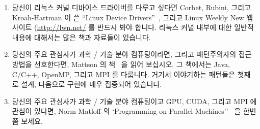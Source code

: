 \begin{enumerate}
\iffalse
\item	If you are interested in an object-oriented patternist
	treatment of parallel programming focussing on C++,
	you might try Volumes~2 and 4 of Schmidt's POSA
	series~\cite{SchmidtStalRohnertBuschmann2000v2Textbook,
	BuschmannHenneySchmidt2007v4Textbook}.
	Volume 4 in particular has some interesting chapters
	applying this work to a warehouse application.
	The realism of this example is attested to by
	the section entitled ``Partitioning the Big Ball of Mud'',
	wherein the problems inherent in parallelism often
	take a back seat to the problems inherent in getting
	one's head around a real-world application.
\fi

\item	당신이 리눅스 커널 디바이스 드라이버를 다루고 싶다면 Corbet, Rubini,
	그리고 Kroah-Hartman 이 쓴 ``Linux Device
	Drivers''~\cite{CorbetRubiniKroahHartman}, 그리고 Linux Weekly New
	웹사이트 (\url{http://lwn.net/} 를 반드시 봐야 합니다.
	리눅스 커널 내부에 대한 일반적 내용에 대해서는 많은 책과 자료들이
	있습니다.

\iffalse
\item	If you want to work with Linux-kernel device drivers,
	then Corbet's, Rubini's, and Kroah-Hartman's
	``Linux Device Drivers''~\cite{CorbetRubiniKroahHartman}
	is indespensible, as is the Linux Weekly News web site
	(\url{http://lwn.net/}.
	There is a large number of books and resources on
	the more general topic of Linux kernel internals.
\fi

\item	당신의 주요 관심사가 과학 / 기술 분야 컴퓨팅이라면, 그리고 패턴주의자의
	접근방법을 선호한다면, Mattson 의 책~\cite{Mattson2005Textbook} 을 읽어
	보십시오.
	그 책에서는 Java, C/C++, OpenMP, 그리고 MPI 를 다룹니다.
	거기서 이야기하는 패턴들은 첫째로 설계, 다음으로 구현에 매우 집중되어
	있습니다.

\iffalse
\item	If your primary focus is scientific and technical computing,
	and you prefer a patternist approach,
	you might try Mattson et al.'s
	textbook~\cite{Mattson2005Textbook}.
	It covers Java, C/C++, OpenMP, and MPI.
	Its patterns are admirably focused first on design,
	then on implementation.
\fi

\item	당신의 주요 관심사가 과학 / 기술 분야 컴퓨팅이고 GPU, CUDA, 그리고 MPI
	에 관심이 있다면, Norm Matloff 의 `Programming on Parallel
	Machines''~\cite{NormMatloff2013ParProcBook} 을 한번쯤 보세요.


\end{enumerate}

